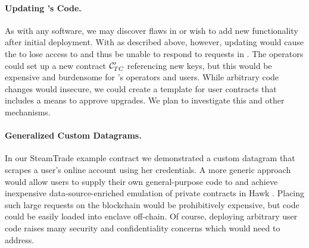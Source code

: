 \paragraph{Updating \tc's Code.}
As with any software, we may discover flaws in \tc or wish to add new functionality after initial deployment.
With \tc as described above, however, updating \engine would cause the \encname to lose access to \skTC and thus be unable to respond to requests in \tcont.
The \tc operators could set up a new contract $\tcont'$ referencing new keys, but this would be expensive and burdensome for \tc's operators and users.
While arbitrary code changes would insecure, we could create a template for user contracts that includes a means to approve upgrades.
We plan to investigate this and other mechanisms.

\paragraph{Generalized Custom Datagrams.}
In our {\sf SteamTrade} example contract we demonstrated a custom datagram that scrapes a user's online account using her credentials.
A more generic approach would allow users to supply their own general-purpose code to \tc and achieve inexpensive data-source-enriched emulation of private contracts in Hawk \cite{hawk}.
Placing such large requests on the blockchain would be prohibitively expensive, but code could be easily loaded into \tc enclave off-chain.
Of course, deploying arbitrary user code raises many security and confidentiality concerns which \tc would need to address.

